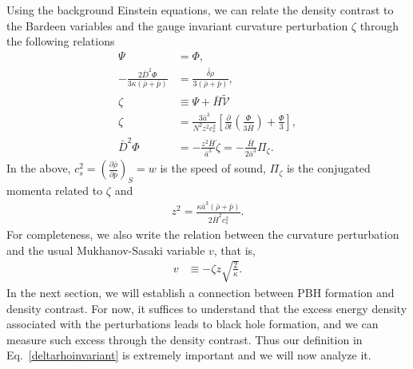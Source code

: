 \documentclass[a4paper,11pt]{article}
\newcommand{\dpar}[1]{\left(#1 \right)}
\begin{document}
Using the background Einstein equations, we can relate the density contrast to the
Bardeen variables and the gauge invariant curvature perturbation $\zeta$ through the
following relations~\cite{Mukhanov1992, Vitenti2013}
\begin{align}
	\Psi                                                    & =\Phi,
	\\
	\label{deltarho}
	-\frac{2\bar{D}^2 \Phi}{3  \kappa (\bar{\rho}+\bar{p})} & =   \frac{{\tilde{\delta\rho}}} {3(\bar{\rho}+\bar{p})}
	,
	\\
	\label{vrelation}
	\zeta                                                   & \equiv \Psi  + \bar{H} \tilde{\mathcal{V}}
	\\
	\label{zeta2}
	\zeta                                                   & = \frac{3  \bar{a}^3}{N^2z^2 c_s^2 } \left[\frac{\partial}{\partial t}\left(\frac{\Phi }{3\bar{H}}\right) + \frac{\Phi}{3}\right]
	,                                                                                                                                                                                           \\
	\label{phiz}
	\bar{D}^{2} \Phi                                        & =  - \frac{z^2\bar{H}}{\bar{a}^3} \dot{\zeta} = -\frac{\bar{H}}{2\bar{a}^3} \Pi_\zeta
	.\end{align}
In the above, $c^{2}_s=\dpar{ \frac{\partial\bar{\rho}}{\partial\bar{p}} }_{S}= w$ is
the speed of sound, $\Pi_\zeta$ is the conjugated momenta related to $\zeta$ and
\begin{align}
	\label{zdef}
	z^2=\frac{\kappa \bar{a}^3 (\bar{\rho} + \bar{p})}{2\bar{H}^2 c_{s}^2}.
\end{align}
For completeness, we also write the relation between the curvature perturbation and the
usual Mukhanov-Sasaki variable $v$, that is,
\begin{align}
	\label{msv}
	v & \equiv - \zeta z \sqrt{\frac{2}{\kappa}}
	.\end{align}
In the next section, we will establish a connection between PBH formation and density
contrast. For now, it suffices to understand that the excess energy density associated
with the perturbations leads to black hole formation, and we can measure such excess
through the density contrast. Thus our definition in Eq.~\eqref{deltarhoinvariant} is
extremely important and we will now analyze it.
\end{document}
